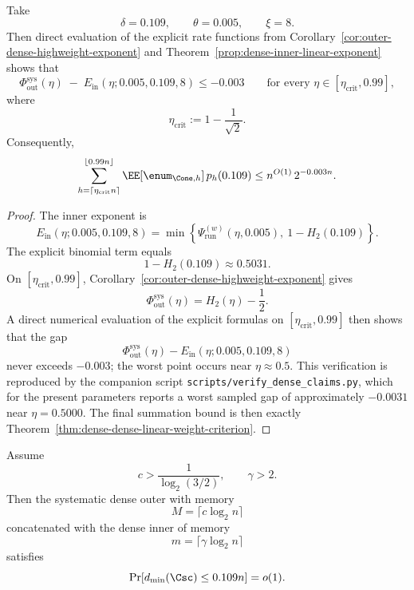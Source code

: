 \begin{theorem}
\label{prop:dense-dense-highweight-gap}
Take
\[
\delta=0.109,
\qquad
\theta=0.005,
\qquad
\xi=8.
\]
Then direct evaluation of the explicit rate functions from
Corollary~\ref{cor:outer-dense-highweight-exponent} and
Theorem~\ref{prop:dense-inner-linear-exponent} shows that
\[
\Phi_{\mathrm{out}}^{\mathrm{sys}}(\eta)
\;
-\;
E_{\mathrm{in}}(\eta;0.005,0.109,8)
\le -0.003
\qquad
\text{for every }\eta\in[\eta_{\mathrm{crit}},0.99],
\]
where
\[
\eta_{\mathrm{crit}}:=1-\frac{1}{\sqrt2}.
\]
Consequently,
\[
\sum_{h=\lceil \eta_{\mathrm{crit}}n\rceil}^{\lfloor 0.99n\rfloor}
\EE[\enum_{\Cone,h}]\,p_h(0.109)
\le
n^{O(1)}\,2^{-0.003n}.
\]
\end{theorem}

\begin{proof}
The inner exponent is
\[
E_{\mathrm{in}}(\eta;0.005,0.109,8)
=
\min\!\left\{
\Psi_{\mathrm{run}}^{(w)}(\eta,0.005),\
1-H_2(0.109)
\right\}.
\]
The explicit binomial term equals
\[
1-H_2(0.109)\approx 0.5031.
\]
On \([\eta_{\mathrm{crit}},0.99]\), Corollary~\ref{cor:outer-dense-highweight-exponent} gives
\[
\Phi_{\mathrm{out}}^{\mathrm{sys}}(\eta)=H_2(\eta)-\frac12.
\]
A direct numerical evaluation of the explicit formulas on \([\eta_{\mathrm{crit}},0.99]\) then shows that the gap
\[
\Phi_{\mathrm{out}}^{\mathrm{sys}}(\eta)-E_{\mathrm{in}}(\eta;0.005,0.109,8)
\]
never exceeds \(-0.003\); the worst point occurs near \(\eta\approx 0.5\).
This verification is reproduced by the companion script
\texttt{scripts/verify\_dense\_claims.py}, which for the present parameters reports a worst sampled gap
of approximately \(-0.0031\) near \(\eta=0.5000\).
The final summation bound is then exactly Theorem~\ref{thm:dense-dense-linear-weight-criterion}.
\end{proof}

\begin{theorem}
\label{thm:dense-dense-explicit-constant}
Assume
\[
c>\frac{1}{\log_2(3/2)},
\qquad
\gamma>2.
\]
Then the systematic dense outer with memory
\[
M=\lceil c\log_2 n\rceil
\]
concatenated with the dense inner of memory
\[
m=\lceil \gamma\log_2 n\rceil
\]
satisfies
\[
\Pr[d_{\min}(\Csc)\le 0.109 n]=o(1).
\]
\end{theorem}

